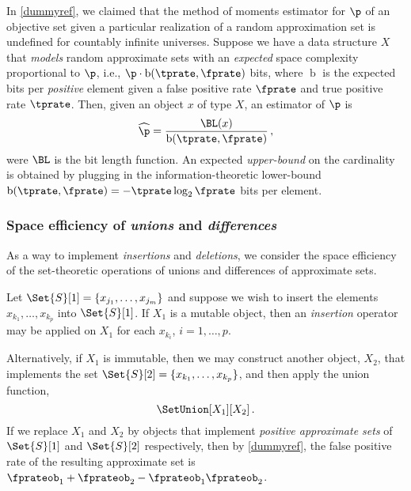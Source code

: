 \documentclass[ ../main.tex]{subfiles}
\begin{document}
In \cref{dummyref}, we claimed that the method of moments estimator for $\p$ of an objective set given a particular realization of a random approximation set is undefined for countably infinite universes.
Suppose we have a data structure $X$ that \emph{models} random approximate sets with an \emph{expected} space complexity proportional to $\p$, i.e., $\p \cdot \operatorname{b}(\tprate,\fprate)$ bits, where $\operatorname{b}$ is the expected bits per \emph{positive} element given a false positive rate $\fprate$ and true positive rate $\tprate$.
Then, given an object $x$ of type $X$, an estimator of $\p$ is
\begin{equation}
	\widehat{\p} = \frac{\BL(x)}{\operatorname{b}(\tprate,\fprate)}\,,
\end{equation}
were $\BL$ is the bit length function.
An expected \emph{upper-bound} on the cardinality is obtained by plugging in the information-theoretic lower-bound $\operatorname{b}(\tprate,\fprate) = -\tprate \log_2 \fprate$ bits per element.

\subsubsection{Space efficiency of \emph{unions} and \emph{differences}}
As a way to implement \emph{insertions} and \emph{deletions}, we consider the space efficiency of the set-theoretic operations of unions and differences of approximate sets.

Let $\Set{S}[1] = \{x_{j_1}, \ldots, x_{j_m}\}$ and suppose we wish to insert the elements $x_{k_1},\ldots,x_{k_p}$ into $\Set{S}[1]$. If $X_1$ is a mutable 
object, then an \emph{insertion} operator may be applied on $X_1$ for each 
$x_{k_i}$, $i=1,\ldots, p$.

Alternatively, if $X_1$ is immutable, then we may construct another object, 
$X_2$, that implements the set $\Set{S}[2] = \{x_{k_1},\ldots, x_{k_p}\}$, and 
then apply the union function,
\begin{equation}
    \SetUnion[X_1][X_2]\,.
\end{equation}
If we replace $X_1$ and $X_2$ by objects that implement \emph{positive 
approximate sets} of $\Set{S}[1]$ and $\Set{S}[2]$ respectively, then by 
\cref{dummyref}, the false positive rate of the resulting approximate set is 
$\fprateob_1 + \fprateob_2 - \fprateob_1 \fprateob_2$.
\end{document}
